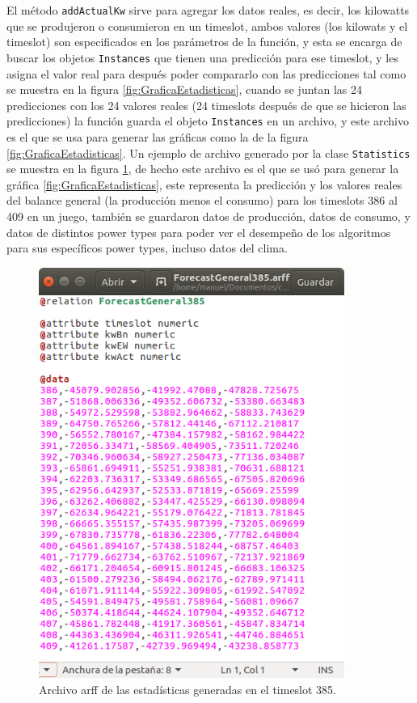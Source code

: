 El método \texttt{addActualKw} sirve para agregar los datos reales, es decir, los kilowatts que se produjeron o consumieron en un timeslot, ambos valores (los kilowats y el timeslot) son especificados en los parámetros de la función, y esta se encarga de buscar los objetos \texttt{Instances} que tienen una predicción para ese timeslot, y les asigna el valor real para después poder compararlo con las predicciones tal como se muestra en la figura \ref{fig:GraficaEstadisticas}, cuando se juntan las 24 predicciones con los 24 valores reales (24 timeslots después de que se hicieron las predicciones) la función guarda el objeto \texttt{Instances} en un archivo, y este archivo es el que se usa para generar las gráficas como la de la figura \ref{fig:GraficaEstadisticas}. Un ejemplo de archivo generado por la clase \texttt{Statistics} se muestra en la figura \ref{fig:ArchivoEstadisticas}, de hecho este archivo es el que se usó para generar la gráfica \ref{fig:GraficaEstadisticas}, este representa la predicción y los valores reales del balance general (la producción menos el consumo) para los timeslots 386 al 409 en un juego, también se guardaron datos de producción, datos de consumo, y datos de distintos power types para poder ver el desempeño de los algoritmos para sus específicos power types, incluso datos del clima.

\begin{figure}[h]
	\centering
	\includegraphics[width=10cm]{img/ArchivoEstadisticas.png}
	\caption{Archivo arff de las estadísticas generadas en el timeslot 385.}
	\label{fig:ArchivoEstadisticas}
\end{figure}
